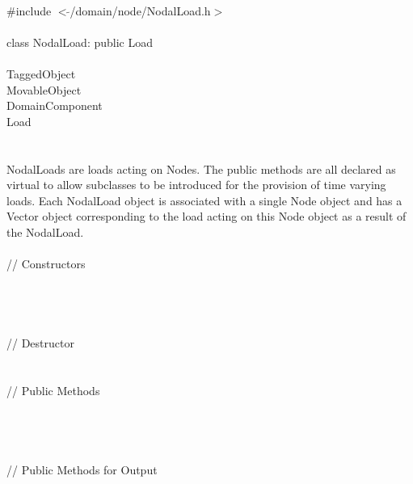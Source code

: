
   \\
\indent \#include $<\tilde{ }$/domain/node/NodalLoad.h$>$  \\

  \\
\indent class NodalLoad: public Load  \\

 \\
\indent TaggedObject \\
\indent MovableObject \\
\indent\indent DomainComponent \\
\indent\indent\indent Load \\
\indent\indent\indent{} \\

  \\
\indent NodalLoads are loads acting on Nodes. The public methods are
all declared as virtual to allow subclasses to be introduced for the
provision of time varying loads. Each NodalLoad object is associated
with a single Node object and has a Vector object corresponding to the
load acting on this Node object as a result of the NodalLoad. \\

  \\
\indent\indent // Constructors  \\
\indent{}  \\ 
\indent{}  \\
\indent{}  \\ \\
\indent\indent // Destructor  \\
\indent{} \\ \\
\indent\indent // Public Methods  \\
\indent{} \\
\indent{} \\
\indent{} \\ \\
\indent\indent // Public Methods for Output \\
\indent{} \\
\indent{} \\
\indent{} \\


